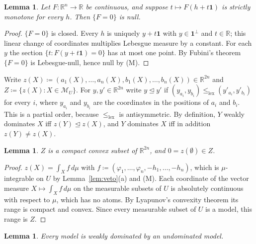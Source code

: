 \documentclass[11pt]{article}
\newcommand{\R}{\mathbb{R}}
\newcommand{\one}{\mathbf{1}}
\newcommand{\M}{\mathcal{M}}
\newcommand{\lexle}{\le_{\mathrm{lex}}}
\theoremstyle{plain}
\newtheorem{lemma}[theorem]{Lemma}
\theoremstyle{definition}
\theoremstyle{remark}
\begin{document}
\begin{lemma}\label{lem:fubini}
Let $F:\R^n\to\R$ be continuous, and suppose $t\mapsto F(h+t\one)$ is strictly monotone
for every $h$. Then $\{F=0\}$ is null.
\end{lemma}

\begin{proof}
$\{F=0\}$ is closed. Every $h$ is uniquely $y+t\one$ with $y\in\one^\perp$ and $t\in\R$;
this linear change of coordinates multiplies Lebesgue measure by a constant. For each $y$
the section $\{t:F(y+t\one)=0\}$ has at most one point. By Fubini's theorem $\{F=0\}$ is
Lebesgue-null, hence null by (M).
\end{proof}

Write $z(X)\coloneqq(a_1(X),\dots,a_n(X),b_1(X),\dots,b_n(X))\in\R^{2n}$ and
$Z\coloneqq\{z(X):X\in\M_U\}$. For $y,y'\in\R^{2n}$ write $y\trianglelefteq y'$ if
$(y_{a_i},y_{b_i})\lexle(y'_{a_i},y'_{b_i})$ for every $i$, where $y_{a_i}$ and $y_{b_i}$
are the coordinates in the positions of $a_i$ and $b_i$. This is a partial order, because
$\lexle$ is antisymmetric. By definition, $Y$ weakly dominates $X$ iff $z(Y)\trianglelefteq
z(X)$, and $Y$ dominates $X$ iff in addition $z(Y)\neq z(X)$.

\begin{lemma}\label{lem:lyap}
$Z$ is a compact convex subset of $\R^{2n}$, and $0=z(\emptyset)\in Z$.
\end{lemma}

\begin{proof}
$z(X)=\int_Xf\,d\mu$ with $f\coloneqq(\varphi_1,\dots,\varphi_n,-h_1,\dots,-h_n)$, which
is $\mu$-integrable on $U$ by Lemma~\ref{lem:veto}(a) and (M). Each coordinate of the
vector measure $X\mapsto\int_Xf\,d\mu$ on the measurable subsets of $U$ is absolutely
continuous with respect to $\mu$, which has no atoms. By Lyapunov's convexity theorem
\cite{Lyapunov,Lindenstrauss} its range is compact and convex. Since every measurable
subset of $U$ is a model, this range is $Z$.
\end{proof}

\begin{lemma}\label{lem:zorn}
Every model is weakly dominated by an undominated model.
\end{lemma}
\end{document}
